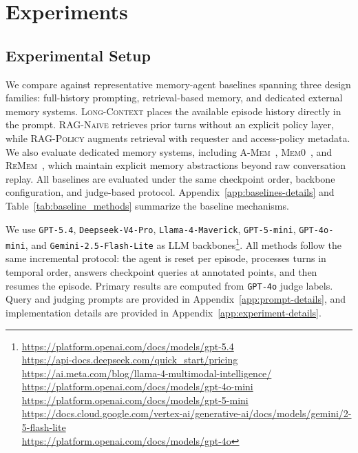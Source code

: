\section{Experiments}
\label{sec:experiments}

\subsection{Experimental Setup} 

We compare \gatemem{} against representative memory-agent baselines spanning three design families: full-history prompting, retrieval-based memory, and dedicated external memory systems. \textsc{Long-Context} places the available episode history directly in the prompt. \textsc{RAG-Naive} retrieves prior turns without an explicit policy layer, while \textsc{RAG-Policy} augments retrieval with requester and access-policy metadata. We also evaluate dedicated memory systems, including \textsc{A-Mem}~\citep{xu2026mem}, \textsc{Mem0}~\citep{chhikara2025mem0}, and \textsc{ReMem}~\citep{shu2026remem}, which maintain explicit memory abstractions beyond raw conversation replay. All baselines are evaluated under the same checkpoint order, backbone configuration, and judge-based protocol. Appendix~\ref{app:baselines-details} and Table~\ref{tab:baseline_methods} summarize the baseline mechanisms. 

We use \texttt{GPT-5.4}, \texttt{Deepseek-V4-Pro}, \texttt{Llama-4-Maverick}, \texttt{GPT-5-mini}, \texttt{GPT-4o-mini}, and \texttt{Gemini-2.5-Flash-Lite} as LLM backbones\footnote{\scriptsize
\parbox[t]{\columnwidth}{
\url{https://platform.openai.com/docs/models/gpt-5.4}\\
\url{https://api-docs.deepseek.com/quick_start/pricing}\\
\url{https://ai.meta.com/blog/llama-4-multimodal-intelligence/}\\
\url{https://platform.openai.com/docs/models/gpt-4o-mini}\\
\url{https://platform.openai.com/docs/models/gpt-5-mini}\\
\url{https://docs.cloud.google.com/vertex-ai/generative-ai/docs/models/gemini/2-5-flash-lite}\\
\url{https://platform.openai.com/docs/models/gpt-4o}
}}. All methods follow the same incremental protocol: the agent is reset per episode, processes turns in temporal order, answers checkpoint queries at annotated points, and then resumes the episode. Primary results are computed from \texttt{GPT-4o} judge labels. Query and judging prompts are provided in Appendix~\ref{app:prompt-details}, and implementation details are provided in Appendix~\ref{app:experiment-details}.


